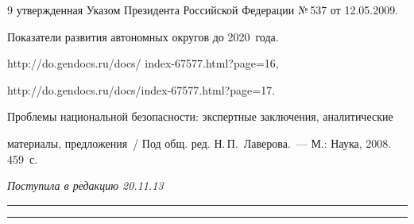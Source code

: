 {{\begin{thebibliography}{9}
утверж\-ден\-ная Указом Президента Российской Федерации №\,537 от 12.05.2009.







     Показатели развития автономных округов до 2020~года.


{\sf http://do.gendocs.ru/docs/ index-67577.html?page=16},


      {\sf http://do.gendocs.ru/docs/index-67577.html?page=17}.







     Проблемы национальной безопасности: экспертные заключения, аналитические


материалы, предложения~/ Под общ. ред. Н.\,П.~Лаверова.~--- М.: Наука, 2008. 459~с.





\end{thebibliography}


}


}





\vspace*{-9pt}





\hfill{\small\textit{Поступила в редакцию 20.11.13}}








\vspace*{12pt}





\hrule





\vspace*{2pt}





\hrule





\def\tit{COMMUNICATORY PROVISIONS FOR~MONITORING OF~NATIONAL SECURITY


FROM~THE~REGIONAL POINT OF~VIEW}






